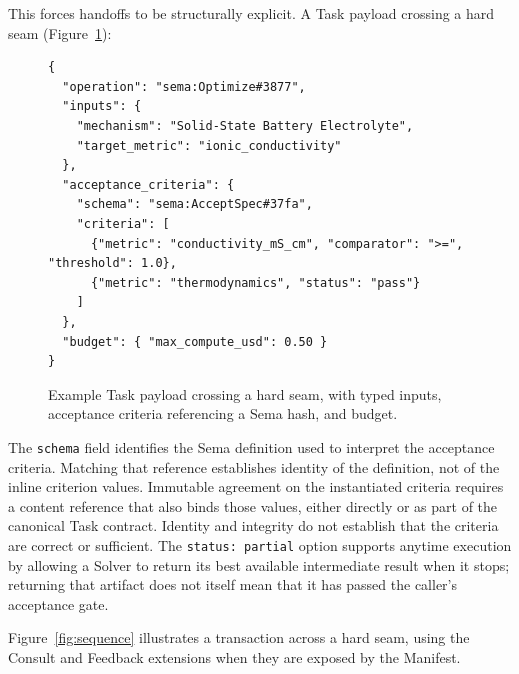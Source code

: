 \documentclass[11pt]{article}
\let\oldtexttt\texttt
\renewcommand{\texttt}[1]{\oldtexttt{\small #1}}
\begin{document}
\noindent This forces handoffs to be structurally explicit. A Task payload crossing a hard seam (Figure~\ref{fig:json_payload}):

\begin{figure}[H]
\begin{rfbox}
\small
\begin{verbatim}
{
  "operation": "sema:Optimize#3877",
  "inputs": {
    "mechanism": "Solid-State Battery Electrolyte",
    "target_metric": "ionic_conductivity"
  },
  "acceptance_criteria": {
    "schema": "sema:AcceptSpec#37fa",
    "criteria": [
      {"metric": "conductivity_mS_cm", "comparator": ">=", "threshold": 1.0},
      {"metric": "thermodynamics", "status": "pass"}
    ]
  },
  "budget": { "max_compute_usd": 0.50 }
}
\end{verbatim}
\end{rfbox}
\caption{Example Task payload crossing a hard seam, with typed inputs, acceptance criteria referencing a Sema hash, and budget.}
\label{fig:json_payload}
\end{figure}

\noindent The \texttt{schema} field identifies the Sema definition used to interpret the acceptance criteria. Matching that reference establishes identity of the definition, not of the inline criterion values. Immutable agreement on the instantiated criteria requires a content reference that also binds those values, either directly or as part of the canonical Task contract. Identity and integrity do not establish that the criteria are correct or sufficient. The \texttt{status: partial} option supports anytime execution by allowing a Solver to return its best available intermediate result when it stops; returning that artifact does not itself mean that it has passed the caller's acceptance gate.

Figure~\ref{fig:sequence} illustrates a transaction across a hard seam, using the Consult and Feedback extensions when they are exposed by the Manifest.
\end{document}
